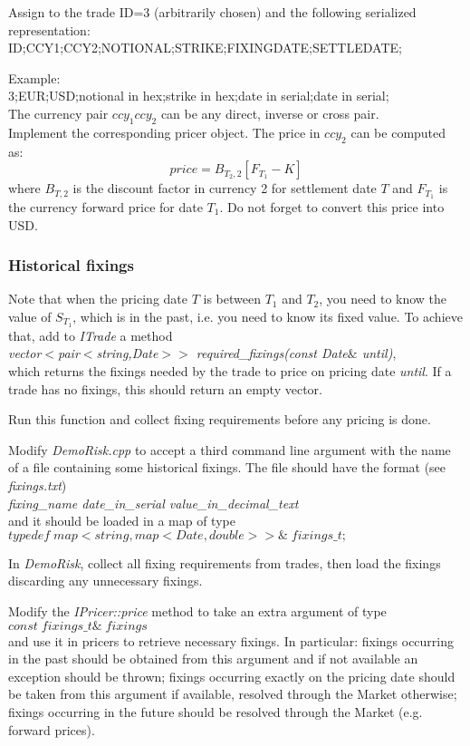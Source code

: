 \documentclass[10pt]{article}
\begin{document}
Assign to the trade ID=3 (arbitrarily chosen) and the following serialized representation:\\
ID;CCY1;CCY2;NOTIONAL;STRIKE;FIXINGDATE;SETTLEDATE;

\noindent Example:\\
3;EUR;USD;notional in hex;strike in hex;date in serial;date in serial;\\

The currency pair $ccy_1ccy_2$ can be any direct, inverse or cross pair.\\

Implement the corresponding pricer object. The price in $ccy_2$ can be computed as:
$$
price=B_{T_2,2}[F_{T_1}-K]
$$
where $B_{T,2}$ is the discount factor in currency 2 for settlement date $T$ and $F_{T_1}$ is the currency forward price for date $T_1$. Do not forget to convert this price into USD.\\

\subsubsection{Historical fixings}
Note that when the pricing date $T$ is between $T_1$ and $T_2$, you need to know the value of $S_{T_1}$, which is in the past, i.e. you need to know its fixed value. To achieve that, add to \textit{ITrade} a method\\
\textit{vector$<$pair$<$string,Date$>>$ required\_fixings(const Date$\&$ until)},\\
which returns the fixings needed by the trade to price on pricing date \textit{until}. If a trade has no fixings, this should return an empty vector.

Run this function and collect fixing requirements before any pricing is done.

Modify \textit{DemoRisk.cpp} to accept a third command line argument with the name of a file containing some historical fixings. The file should have the format (see \textit{fixings.txt})\\
\textit{fixing\_name date\_in\_serial value\_in\_decimal\_text}\\
and it should be loaded in a map of type\\
$typedef\; map<string,map<Date,double>>\&\; fixings\_t;$

In \textit{DemoRisk}, collect all fixing requirements from trades, then load the fixings discarding any unnecessary fixings.

Modify the \textit{IPricer::price} method to take an extra argument of type\\ $const\; fixings\_t\&\; fixings$\\ and use it in pricers to retrieve necessary fixings. In particular: fixings occurring in the past should be obtained from this argument and if not available an exception should be thrown; fixings occurring exactly on the pricing date should be taken from this argument if available, resolved through the Market otherwise; fixings occurring in the future should be resolved through the Market (e.g. forward prices).
\end{document}
